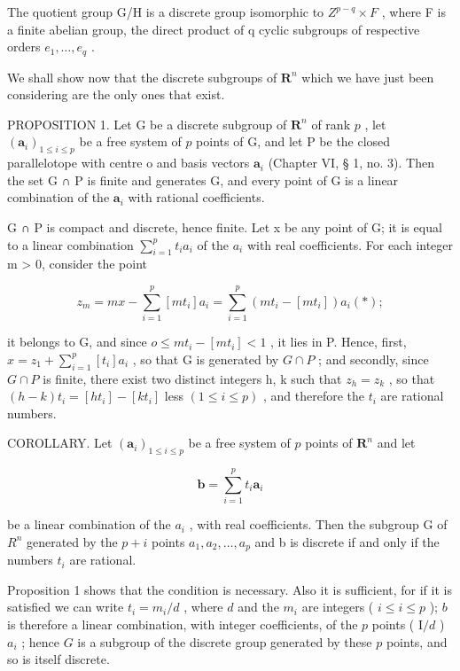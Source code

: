 The quotient group G/H is a discrete group isomorphic to \(Z^{p-q} \times F\) , where F is a finite abelian group, the direct product of q cyclic subgroups of respective orders \(e_{1}, \ldots, e_{q}\) .

We shall show now that the discrete subgroups of \(\mathbf{R}^n\) which we have just been considering are the only ones that exist.

PROPOSITION 1. Let G be a discrete subgroup of \(\mathbf{R}^n\) of rank \(p\) , let \((\boldsymbol{a}_i)_{1 \leqslant i \leqslant p}\) be a free system of \(p\) points of G, and let P be the closed parallelotope with centre o and basis vectors \(\boldsymbol{a}_i\) (Chapter VI, § 1, no. 3). Then the set G ∩ P is finite and generates G, and every point of G is a linear combination of the \(\boldsymbol{a}_i\) with rational coefficients.

G ∩ P is compact and discrete, hence finite. Let x be any point of G; it is equal to a linear combination \(\sum_{i=1}^{p} t_{i}a_{i}\) of the \(a_{i}\) with real coefficients. For each integer m \textgreater{} 0, consider the point

\[
z _ {m} = m x - \sum_ {i = 1} ^ {p} [ m t _ {i} ] a _ {i} = \sum_ {i = 1} ^ {p} (m t _ {i} - [ m t _ {i} ]) a _ {i} (*);
\]

it belongs to G, and since \(o \leqslant mt_{i} - [mt_{i}] < 1\) , it lies in P. Hence, first, \(x = z_{1} + \sum_{i=1}^{p} [t_{i}] a_{i}\) , so that G is generated by \(G \cap P\) ; and secondly, since \(G \cap P\) is finite, there exist two distinct integers h, k such that \(z_{h} = z_{k}\) , so that \((h - k)t_{i} = [ht_{i}] - [kt_{i}]\) less \((1 \leqslant i \leqslant p)\) , and therefore the \(t_{i}\) are rational numbers.

COROLLARY. Let \((\pmb{a}_i)_{1\leqslant i\leqslant p}\) be a free system of \(p\) points of \(\mathbf{R}^n\) and let

\[
\boldsymbol {b} = \sum_ {i = 1} ^ {p} t _ {i} \boldsymbol {a} _ {i}
\]

be a linear combination of the \(a_{i}\) , with real coefficients. Then the subgroup G of \(R^{n}\) generated by the \(p + i\) points \(a_{1}, a_{2}, \ldots, a_{p}\) and b is discrete if and only if the numbers \(t_{i}\) are rational.

Proposition 1 shows that the condition is necessary. Also it is sufficient, for if it is satisfied we can write \(t_i = m_i / d\) , where \(d\) and the \(m_i\) are integers ( \(i \leqslant i \leqslant p\) ); \(b\) is therefore a linear combination, with integer coefficients, of the \(p\) points ( \(\mathrm{I} / d\) ) \(a_i\) ; hence \(G\) is a subgroup of the discrete group generated by these \(p\) points, and so is itself discrete.

